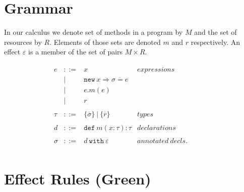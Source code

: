 \documentclass{article}
\newcommand{\keywadj}[1]{\mathtt{#1}}
\newcommand{\keyw}[1]{\keywadj{#1}~}
\begin{document}
\section{Grammar}

In our calculus we denote set of methods in a program by $M$ and the set of resources by $R$. Elements of those sets are denoted $m$ and $r$ respectively. An effect $\varepsilon$ is a member of the set of pairs $M \times R$.

\[
\begin{array}{lll}

\begin{array}{lllr}
e & ::= & x & expressions \\
  & | & \keywadj{new}~x \Rightarrow \overline{\sigma = e} \\
  & | & e.m(e)\\
  & | & r \\
&&\\

\tau & ::= & \{ \overline{\sigma} \} ~ | ~ \{ \overline r \} & types \\

\\d & ::= & \keyw{def} m(x:\tau):\tau & declarations\\
&&\\

\sigma & ::= & d~\keyw{with}\varepsilon  & annotated~ decls.\\

\end{array}
& ~~~~~~
&
\end{array}
\]

\section{Effect Rules (Green)}
\end{document}
